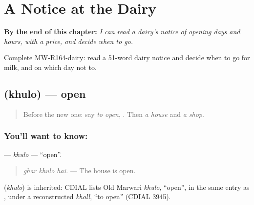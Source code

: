 
\chapter{A Notice at the Dairy}
\label{ch:mw-a2-a-notice-at-the-dairy}

\begin{chapteropening}
\textbf{By the end of this chapter:} \emph{I can read a dairy's notice of opening days and hours, with a price, and decide when to go.}

Complete MW-R164-dairy: read a 51-word dairy notice and decide when to go for milk, and on which day not to.
\end{chapteropening}

\section[\texorpdfstring{\mw{खुलो} (khulo)}{खुलो (khulo)}]{ (khulo) — open}

\label{lesson:MW-C164-khulo}



\begin{quote}
Before the new one: say \emph{to open}, \textbf{}. Then \emph{a house} and \emph{a shop}.
\end{quote}

\subsection*{You'll want to know: }
\textbf{} — \emph{khulo} — \textquotedblleft{}open\textquotedblright{}.

\begin{quote}
\textbf{  }
\end{quote}

\begin{quote}
\emph{ghar khulo hai.} — The house is open.
\end{quote}

\begin{cousinweb}
\textbf{} (\emph{khulo}) is inherited: CDIAL lists Old Marwari \emph{khulo}, \textquotedblleft{}open\textquotedblright{}, in the same entry as \textbf{}, under a reconstructed \emph{khōll}, \textquotedblleft{}to open\textquotedblright{} (CDIAL 3945).
\end{cousinweb}

